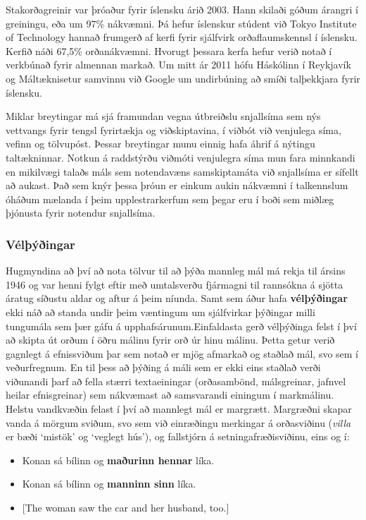 \documentclass{../../metanetpaper}
\begin{document}
\begin{multicols}{2}
Stakorðagreinir var þróaður fyrir íslensku árið 2003. Hann skilaði góðum árangri í greiningu, eða um 97\% nákvæmni. Þá hefur íslenskur stúdent við Tokyo Institute of Technology hannað frumgerð af kerfi fyrir sjálfvirk orðaflaumskennsl í íslensku. Kerfið náði 67,5\% orðanákvæmni\cite{hind1}. Hvorugt þessara kerfa hefur verið notað í verkbúnað fyrir almennan markað. Um mitt ár 2011 hófu Háskólinn í Reykjavík og Máltæknisetur samvinnu við Google um undirbúning að smíði talþekkjara fyrir íslensku\cite{alm1}.

Miklar breytingar má sjá framundan vegna útbreiðslu snjallsíma sem nýs vettvangs fyrir tengsl fyrirtækja og viðskiptavina, í viðbót við venjulega síma, vefinn og tölvupóst. Þessar breytingar munu einnig hafa áhrif á nýtingu taltækninnar. Notkun á raddstýrðu viðmóti venjulegra síma mun fara minnkandi en mikilvægi talaðs máls sem notendavæns samskiptamáta við snjallsíma er sífellt að aukast. Það sem knýr þessa þróun er einkum aukin nákvæmni í talkennslum óháðum mælanda í þeim upplestrarkerfum sem þegar eru í boði sem miðlæg þjónusta fyrir notendur snjallsíma.

\subsubsection{Vélþýðingar}

Hugmyndina að því að nota tölvur til að þýða mannleg mál má rekja til ársins 1946 og var henni fylgt eftir með umtalsverðu fjármagni til rannsókna á sjötta áratug síðustu aldar og aftur á þeim níunda. Samt sem áður hafa \textbf{vélþýðingar} ekki náð að standa undir þeim væntingum um sjálfvirkar þýðingar milli tungumála sem þær gáfu á upphafsárunum.Einfaldasta gerð vélþýðinga felst í því að skipta út orðum í öðru málinu fyrir orð úr hinu málinu. Þetta getur verið gagnlegt á efnissviðum þar sem notað er mjög afmarkað og staðlað mál, svo sem í veðurfregnum. En til þess að þýðing á máli sem er ekki eins staðlað verði viðunandi þarf að fella stærri textaeiningar (orðasambönd, málsgreinar, jafnvel heilar efnisgreinar) sem nákvæmast að samsvarandi einingum í markmálinu. Helstu vandkvæðin felast í því að mannlegt mál er margrætt. Margræðni skapar vanda á mörgum sviðum, svo sem við einræðingu merkingar á orðasviðinu (\textit{villa} er bæði ‘mistök’ og ‘veglegt hús’), og fallstjórn á setningafræðisviðinu, eins og í:

\begin{itemize}
\item Konan sá bílinn og \textbf{maðurinn hennar} líka.
\item Konan sá bílinn og \textbf{manninn sinn} líka.
\item {[}The woman saw the car and her husband, too.{]}
\end{itemize}


\end{multicols}
\end{document}
